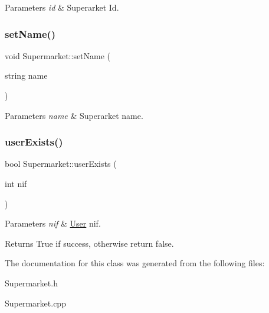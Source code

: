 \begin{DoxyParams}{Parameters}
{\em id} & Superarket Id. \\
\hline
\end{DoxyParams}
\mbox{\label{class_supermarket_a4073d7d0b8aeb1d1dd585d2394e37394}} 
\subsubsection{\texorpdfstring{set\+Name()}{setName()}}
{\footnotesize\ttfamily void Supermarket\+::set\+Name (\begin{DoxyParamCaption}\item[{string}]{name }\end{DoxyParamCaption})}


\begin{DoxyParams}{Parameters}
{\em name} & Superarket name. \\
\hline
\end{DoxyParams}
\mbox{\label{class_supermarket_a12f1deca7800f765ace1f4b8f6b13e3f}} 
\subsubsection{\texorpdfstring{user\+Exists()}{userExists()}}
{\footnotesize\ttfamily bool Supermarket\+::user\+Exists (\begin{DoxyParamCaption}\item[{int}]{nif }\end{DoxyParamCaption})}


\begin{DoxyParams}{Parameters}
{\em nif} & \hyperlink{class_user}{User} nif.\\
\hline
\end{DoxyParams}
\begin{DoxyReturn}{Returns}
True if success, otherwise return false. 
\end{DoxyReturn}


The documentation for this class was generated from the following files\+:\begin{DoxyCompactItemize}
\item 
Supermarket.\+h\item 
Supermarket.\+cpp\end{DoxyCompactItemize}
